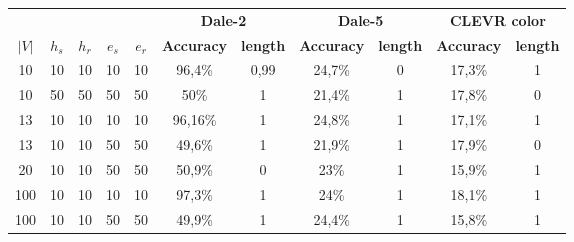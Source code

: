 \begin{table}[h]
    \centering
    \begin{tabular}{ccccc|cc|cc|cc}
        \toprule
              &         &         &         &         & \multicolumn{2}{c}{\textbf{Dale-2}} & \multicolumn{2}{c}{\textbf{Dale-5}} & \multicolumn{2}{c}{\textbf{CLEVR color}}                                                         \\\cmidrule(lr){6-7}\cmidrule(lr){8-9}\cmidrule(lr){10-11}
        $|V|$ & $h_{s}$ & $h_{r}$ & $e_{s}$ & $e_{r}$ & \textbf{Accuracy}                   & \textbf{length}                     & \textbf{Accuracy}                        & \textbf{length} & \textbf{Accuracy} & \textbf{length} \\\midrule
        {10}  & {10}    & {10}    & {10}    & {10}    & {96,4\%}                            & {0,99}                              & {24,7\%}                                 & {0}             & {17,3\%}          & {1}             \\
        {10}  & {50}    & {50}    & {50}    & {50}    & {50\%}                              & {1}                                 & {21,4\%}                                 & {1}             & {17,8\%}          & {0}             \\
        {13}  & {10}    & {10}    & {10}    & {10}    & {96,16\%}                           & {1}                                 & {24,8\%}                                 & {1}             & {17,1\%}          & {1}             \\
        {13}  & {10}    & {10}    & {50}    & {50}    & {49,6\%}                            & {1}                                 & {21,9\%}                                 & {1}             & {17,9\%}          & {0}             \\
        {20}  & {10}    & {10}    & {50}    & {50}    & {50,9\%}                            & {0}                                 & {23\%}                                   & {1}             & {15,9\%}          & {1}             \\
        {100} & {10}    & {10}    & {10}    & {10}    & {97,3\%}                            & {1}                                 & {24\%}                                   & {1}             & {18,1\%}          & {1}             \\
        {100} & {10}    & {10}    & {50}    & {50}    & {49,9\%}                            & {1}                                 & {24,4\%}                                 & {1}             & {15,8\%}          & {1}             \\

\end{tabular}
\end{table}
